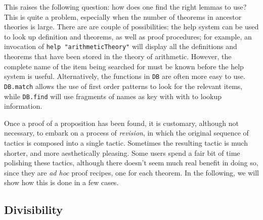 \documentclass[12pt,fleqn,layout,a4paper]{report}
\begin{document}
This raises the following question: how does one find the right lemmas
to use? This is quite a problem, especially when the number of
theorems in ancestor theories is large. There are are couple of
possibilities: the help system can be used to look up definition and
theorems, as well as proof procedures; for example, an invocation of
\verb+help "arithmeticTheory"+ will display all the definitions and
theorems that have been stored in the theory of arithmetic. However,
the complete name of the item being searched for must be known before
the help system is useful. Alternatively, the functions in \verb+DB+
are often more easy to use. \verb+DB.match+ allows the use of first
order patterns to look for the relevant items, while \verb+DB.find+
will use fragments of names as key with with to lookup information.

Once a proof of a proposition has been found, it is customary, although
not necessary, to embark on a process of {\it revision}, in which the
original sequence of tactics is composed into a single tactic. Sometimes
the resulting tactic is much shorter, and more aesthetically
pleasing. Some users spend a fair bit of time polishing these tactics,
although there doesn't seem much real benefit in doing so, since they
are {\it ad hoc\/} proof recipes, one for each theorem. In the
following, we will show how this is done in a few cases.

\subsection{Divisibility}
\end{document}
